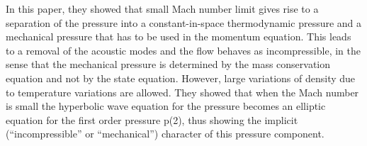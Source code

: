 \noindent In this paper, they showed that small Mach number limit gives rise to a separation of the pressure into a constant-in-space thermodynamic pressure and a mechanical pressure that has to be used in the momentum equation. This leads to a removal of the acoustic modes and the flow behaves as incompressible, in the sense that the mechanical pressure is determined by the mass conservation
equation and not by the state equation. However, large variations of density
due to temperature variations are allowed. They showed that when the Mach number is small the hyperbolic wave equation for the pressure becomes an elliptic
equation for the first order pressure p(2), thus showing the implicit (“incompressible” or “mechanical”) character of this pressure component.
